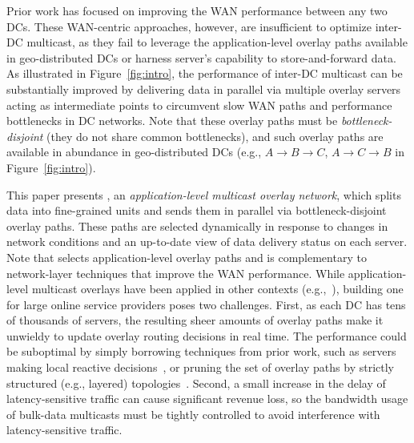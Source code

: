 Prior work has focused on improving the WAN performance
between any two DCs. These WAN-centric approaches, however, are insufficient to
optimize inter-DC multicast, as they fail to leverage
the application-level overlay paths available in
geo-distributed DCs or harness server's capability to
store-and-forward data.
As illustrated in Figure~\ref{fig:intro}, the performance of
inter-DC multicast can be substantially improved by
delivering data in parallel via multiple overlay servers
acting as intermediate points to circumvent slow WAN paths and
performance bottlenecks in DC networks.
Note that these overlay paths must be {\em bottleneck-disjoint} (they do
not share common bottlenecks), and
such overlay paths are available in abundance in
geo-distributed DCs (e.g., $A$$\rightarrow$$B$$\rightarrow$$C$,
$A$$\rightarrow$$C$$\rightarrow$$B$ in Figure~\ref{fig:intro}).




This paper presents {\em \name}, an {\em application-level
multicast overlay network}, which splits data into fine-grained
units and sends them in parallel via bottleneck-disjoint
overlay paths. These paths are selected dynamically in response to changes in
network conditions and an up-to-date view
of data delivery status on each server.
Note that \name selects application-level overlay paths and is
complementary to network-layer techniques that
improve the WAN performance.
While application-level multicast overlays have been applied
in other contexts
(e.g.,~\cite{Liebeherr2002Application,Wang2007mTreebone,
Andreev2013Designing,Mokhtarian2015Minimum}), building one
for large online service providers poses two
challenges.
First, as each DC has tens of thousands of servers, the
resulting sheer amounts of overlay paths make it
unwieldy to update overlay routing decisions in real time.
The performance could be suboptimal by simply borrowing techniques
from prior work, such as servers making local reactive
decisions~\cite{kostic2003bullet,Repantis2010Scaling,Huang2014A},
or pruning the set of overlay paths by strictly
structured (e.g., layered) topologies~\cite{Nygren2010The}.
Second, a small increase in the delay of latency-sensitive traffic
can cause significant revenue loss, so the bandwidth usage
of bulk-data multicasts must be tightly controlled
to avoid interference with latency-sensitive
traffic.


